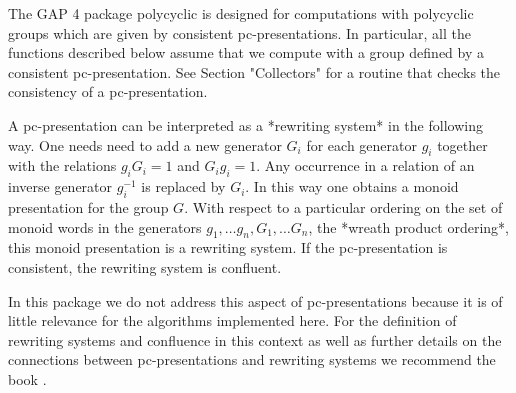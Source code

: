 The GAP 4 package {\sf polycyclic} is designed for computations with
polycyclic groups which are given by consistent pc-presentations. In
particular, all the functions described below assume that we compute
with a group defined by a consistent pc-presentation. See Section 
"Collectors" for a routine that checks the consistency of a
pc-presentation. 

A pc-presentation can be interpreted as a *rewriting system* in the
following way.  One needs need to add a new generator $G_i$ for each
generator $g_i$ together with the relations $g_iG_i = 1$ and $G_ig_i =
1$.  Any occurrence in a relation of an inverse generator $g_i^{-1}$
is replaced by $G_i$.  In this way one obtains a monoid presentation
for the group $G$.  With respect to a particular ordering on the set
of monoid words in the generators $g_1,\ldots g_n,G_1,\ldots G_n$, the
*wreath product ordering*, this monoid presentation is a rewriting
system.  If the pc-presentation is consistent, the 
rewriting system is confluent.

In this package we do not address this aspect of pc-presentations
because it is of little relevance for the algorithms implemented here.
For the definition of rewriting systems and confluence in this context
as well as further details on the connections between pc-presentations
and rewriting systems we recommend the book \cite{Sims94}.



